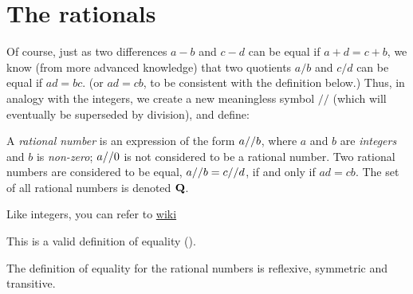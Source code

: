 \section{The rationals} \label{sec 4.2}

Of course, just as two differences \(a - b\) and \(c - d\) can be equal if \(a+d = c+b\), we know (from more advanced knowledge) that two quotients \(a / b\) and \(c / d\) can be equal if \(ad = bc\). (or \(ad = cb\), to be consistent with the definition below.)
Thus, in analogy with the integers, we create a new meaningless symbol \(//\) (which will eventually be superseded by division), and define:

\begin{definition} \label{def 4.2.1}
A \emph{rational number} is an expression of the form \(a \text{//} b\), where \(a\) and \(b\) are \emph{integers} and \(b\) is \emph{non-zero}; \(a \text{//} 0\) is not considered to be a rational number.
Two rational numbers are considered to be equal, \(a \text{//} b = c \text{//} d\), if and only if \(ad = cb\).
The set of all rational numbers is denoted \(\mathbf{Q}\).
\end{definition}

\begin{note}
Like integers, you can refer to \href{https://www.wikiwand.com/en/Rational_number#/Formal_construction}{wiki}
\end{note}

This is a valid definition of equality ().

\begin{additional corollary} \label{ac 4.2.1}
The definition of equality for the rational numbers is reflexive, symmetric and transitive.
\end{additional corollary}

